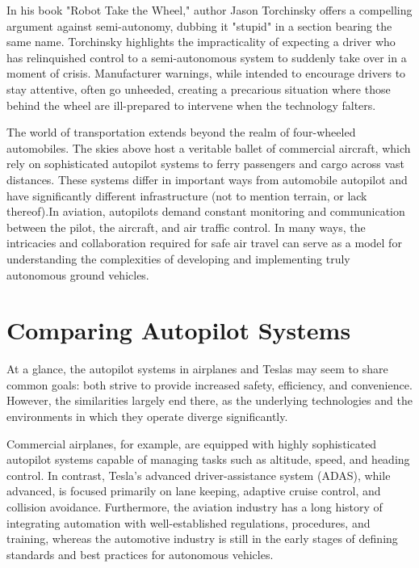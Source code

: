 In his book "Robot Take the Wheel," author Jason Torchinsky offers a compelling argument against semi-autonomy, dubbing it "stupid" in a section bearing the same name. Torchinsky highlights the impracticality of expecting a driver who has relinquished control to a semi-autonomous system to suddenly take over in a moment of crisis. Manufacturer warnings, while intended to encourage drivers to stay attentive, often go unheeded, creating a precarious situation where those behind the wheel are ill-prepared to intervene when the technology falters.

The world of transportation extends beyond the realm of four-wheeled automobiles. The skies above host a veritable ballet of commercial aircraft, which rely on sophisticated autopilot systems to ferry passengers and cargo across vast distances. These systems differ in important ways from automobile autopilot and have significantly different infrastructure (not to mention terrain, or lack thereof).In aviation, autopilots demand constant monitoring and communication between the pilot, the aircraft, and air traffic control. In many ways, the intricacies and collaboration required for safe air travel can serve as a model for understanding the complexities of developing and implementing truly autonomous ground vehicles.

\section{Comparing Autopilot Systems}

At a glance, the autopilot systems in airplanes and Teslas may seem to share common goals: both strive to provide increased safety, efficiency, and convenience. However, the similarities largely end there, as the underlying technologies and the environments in which they operate diverge significantly.

Commercial airplanes, for example, are equipped with highly sophisticated autopilot systems capable of managing tasks such as altitude, speed, and heading control. In contrast, Tesla's advanced driver-assistance system (ADAS), while advanced, is focused primarily on lane keeping, adaptive cruise control, and collision avoidance. Furthermore, the aviation industry has a long history of integrating automation with well-established regulations, procedures, and training, whereas the automotive industry is still in the early stages of defining standards and best practices for autonomous vehicles.

